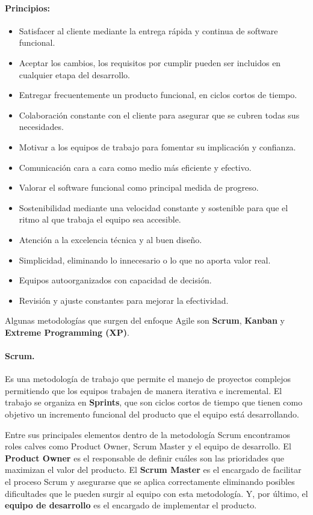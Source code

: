 \paragraph{Principios:}
\begin{itemize}
    \item Satisfacer al cliente mediante la entrega rápida y continua de software funcional.
    \item Aceptar los cambios, los requisitos por cumplir pueden ser incluidos en cualquier etapa del desarrollo.
    \item Entregar frecuentemente un producto funcional, en ciclos cortos de tiempo.
    \item Colaboración constante con el cliente para asegurar que se cubren todas sus necesidades.
    \item Motivar a los equipos de trabajo para fomentar su implicación y confianza.
    \item Comunicación cara a cara como medio más eficiente y efectivo.
    \item Valorar el software funcional como principal medida de progreso.
    \item Sostenibilidad mediante una velocidad constante y sostenible para que el ritmo al que trabaja el equipo sea accesible.
    \item Atención a la excelencia técnica y al buen diseño.
    \item Simplicidad, eliminando lo innecesario o lo que no aporta valor real.
    \item Equipos autoorganizados con capacidad de decisión.
    \item Revisión y ajuste constantes para mejorar la efectividad.
\end{itemize}

Algunas metodologías que surgen del enfoque Agile son \textbf{Scrum}, \textbf{Kanban} y \textbf{Extreme Programming (XP)}.

\paragraph{Scrum.} Es una metodología de trabajo que permite el manejo de proyectos complejos permitiendo que los equipos trabajen de manera iterativa e incremental. El trabajo se organiza en \textbf{Sprints}, que son ciclos cortos de tiempo que tienen como objetivo un incremento funcional del producto que el equipo está desarrollando.\cite{scrum}

Entre sus principales elementos dentro de la metodología Scrum encontramos roles calves como Product Owner, Scrum Master y el equipo de desarrollo. El \textbf{Product Owner} es el responsable de definir cuáles son las prioridades que maximizan el valor del producto. El \textbf{Scrum Master} es el encargado de facilitar el proceso Scrum y asegurarse que se aplica correctamente eliminando posibles dificultades que le pueden surgir al equipo con esta metodología. Y, por último, el \textbf{equipo de desarrollo} es el encargado de implementar el producto.

